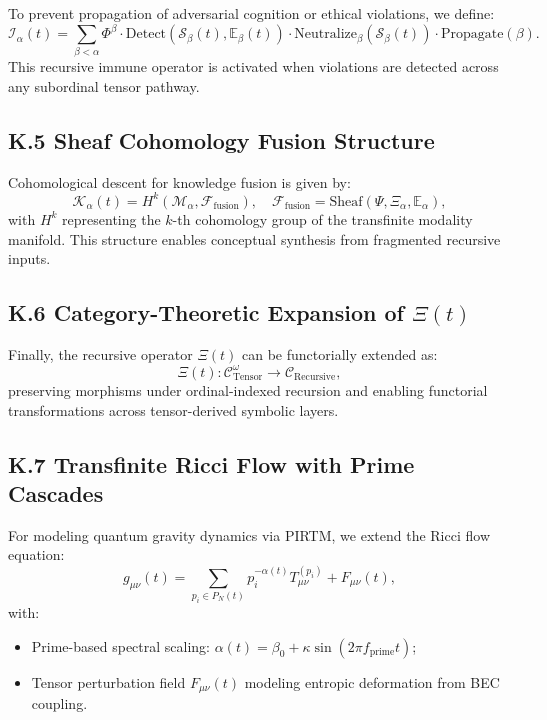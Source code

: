 \documentclass[12pt]{article}
\begin{document}
\begin{itemize}
To prevent propagation of adversarial cognition or ethical violations, we define:
\[
\mathcal{I}_\alpha(t) = \sum_{\beta < \alpha} \Phi^\beta \cdot \text{Detect}(\mathcal{S}_\beta(t), \mathbb{E}_\beta(t)) \cdot \text{Neutralize}_\beta(\mathcal{S}_\beta(t)) \cdot \text{Propagate}(\beta).
\]
This recursive immune operator is activated when violations are detected across any subordinal tensor pathway.

\subsection*{K.5 \quad Sheaf Cohomology Fusion Structure}

Cohomological descent for knowledge fusion is given by:
\[
\mathcal{K}_\alpha(t) = H^k(\mathcal{M}_\alpha, \mathcal{F}_{\text{fusion}}), \quad \mathcal{F}_{\text{fusion}} = \text{Sheaf}(\Psi, \Xi_\alpha, \mathbb{E}_\alpha),
\]
with \( H^k \) representing the \( k \)-th cohomology group of the transfinite modality manifold. This structure enables conceptual synthesis from fragmented recursive inputs.

\subsection*{K.6 \quad Category-Theoretic Expansion of \( \Xi(t) \)}

Finally, the recursive operator \( \Xi(t) \) can be functorially extended as:
\[
\Xi(t): \mathcal{C}_{\text{Tensor}}^\omega \to \mathcal{C}_{\text{Recursive}},
\]
preserving morphisms under ordinal-indexed recursion and enabling functorial transformations across tensor-derived symbolic layers.

\subsection*{K.7 \quad Transfinite Ricci Flow with Prime Cascades}

For modeling quantum gravity dynamics via PIRTM, we extend the Ricci flow equation:
\[
g_{\mu\nu}(t) = \sum_{p_i \in P_N(t)} p_i^{-\alpha(t)} T^{(p_i)}_{\mu\nu} + F_{\mu\nu}(t),
\]
with:
\begin{itemize}
    \item Prime-based spectral scaling: \( \alpha(t) = \beta_0 + \kappa \sin(2\pi f_{\text{prime}} t) \);
    \item Tensor perturbation field \( F_{\mu\nu}(t) \) modeling entropic deformation from BEC coupling.
\end{itemize}


\end{itemize}
\end{document}
